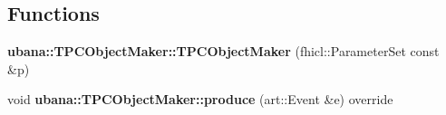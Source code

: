\subsection*{\-Functions}
\begin{DoxyCompactItemize}
\item 
\hypertarget{group__UBXSec_gae030804e6aa4085bef6be52e9618fee9}{{\bfseries ubana\-::\-T\-P\-C\-Object\-Maker\-::\-T\-P\-C\-Object\-Maker} (fhicl\-::\-Parameter\-Set const \&p)}\label{group__UBXSec_gae030804e6aa4085bef6be52e9618fee9}

\item 
\hypertarget{group__UBXSec_ga07c03a811bbaccdbeb20b2b7714034c9}{void {\bfseries ubana\-::\-T\-P\-C\-Object\-Maker\-::produce} (art\-::\-Event \&e) override}\label{group__UBXSec_ga07c03a811bbaccdbeb20b2b7714034c9}


\end{DoxyCompactItemize}
